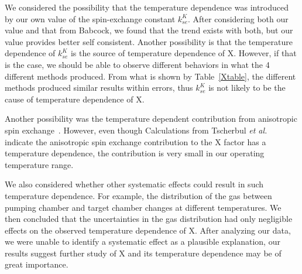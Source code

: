 We considered the possibility that the temperature dependence was introduced by our own value of the spin-exchange constant $k_{se}^{K}$. After considering both our value and that from Babcock, we found that the trend exists with both, but our value provides better self consistent. Another possibility is that the temperature dependence of $k_{se}^{K}$ is the source of temperature dependence of X. However, if that is the case, we should be able to observe different behaviors in what the 4 different methods produced. From what is shown by Table~\ref{Xtable}, the different methods produced similar results within errors, thus $k_{se}^K$ is not likely to be the cause of temperature dependence of X.

Another possibility was the temperature dependent contribution from anisotropic spin exchange~\cite{PhysRevA.81.032709}. However, even though Calculations from Tscherbul \emph{et al.}~\cite{PhysRevLett.107.023204} indicate the anisotropic spin exchange contribution to the X factor has a temperature dependence, the contribution is very small in our operating temperature range.

We also considered whether other systematic effects could result in such temperature dependence. For example, the distribution of the gas between pumping chamber and target chamber changes at different temperatures. We then concluded that the uncertainties in the gas distribution had only negligible effects on the observed temperature dependence of X. After analyzing our data, we were unable to identify a systematic effect as a plausible explanation, our results suggest further study of X and its temperature dependence may be of great importance.
















